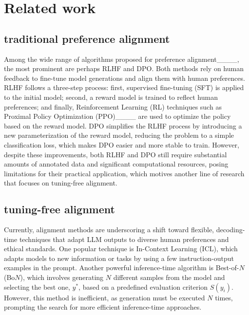 \section{Related work}
\subsection{traditional preference alignment}
	Among the wide range of algorithms proposed for preference alignment____, the most prominent are perhaps RLHF and DPO. Both methods rely on human feedback to fine-tune model generations and align them with human preferences.
	RLHF follows a three-step process: first, supervised fine-tuning (SFT) is applied to the initial model; second, a reward model is trained to reflect human preferences; and finally, Reinforcement Learning (RL) techniques such as Proximal Policy Optimization (PPO)____ are used to optimize the policy based on the reward model.
	DPO simplifies the RLHF process by introducing a new parameterization of the reward model, reducing the problem to a simple classification loss, which makes DPO easier and more stable to train. However, despite these improvements, both RLHF and DPO still require substantial amounts of annotated data and significant computational resources, posing limitations for their practical application, which motives another line of research that focuses on tuning-free alignment.
	\subsection{tuning-free alignment}
Currently, alignment methods are underscoring a shift toward flexible, decoding-time techniques that adapt LLM outputs to diverse human preferences and ethical standards. One popular technique is In-Context Learning (ICL), which adapts models to new information or tasks by using a few instruction-output examples in the prompt. Another powerful inference-time algorithm is Best-of-$N$ (Bo$N$), which involves generating $N$ different samples from the model and selecting the best one, $y^*$, based on a predefined evaluation criterion $S(y_i)$. However, this method is inefficient, as generation must be executed $N$ times, prompting the search for more efficient inference-time approaches.

